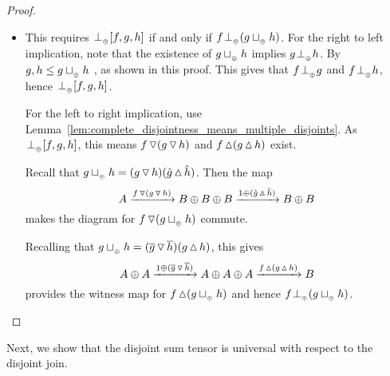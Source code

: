 \begin{proof}
\begin{itemize}
    \item [\axiom{DJ}{4}] This requires $\tperp [f,g,h]$ if and only if $f \tperp (g \tjoin h)$.
      For the right to left implication, note that the existence of $g\tjoin h$ implies $g \tperp
      h$. By  $g, h \le g\tjoin h$ , as shown in this proof. This gives
      that $f \tperp g$ and $f \tperp h$, hence $\tperp [f,g,h]$.

      For the left to right implication, use
      Lemma~\ref{lem:complete_disjointness_means_multiple_disjoints}. As $\tperp [f,g,h]$,
      this means $f\tjdown(g\tjdown h)$ and $f\tjup(g\tjup h)$ exist.

      Recall that $g\tjoin h = (g\tjdown h)(\rg{g}\tjup\rg{h})$. Then the map
      \[
        A\xrightarrow{f\tjdown(g\tjdown h)} B\+B\+B\xrightarrow{1\+(\rg{g}\tjup\rg{h})} B\+B
      \]
      makes the diagram for $f \tjdown (g\tjoin h)$ commute.

      Recalling that  $g\tjoin h =
      (\rst{g}\tjdown \rst{h})(g\tjup h)$, this gives
      \[
        A\+A\xrightarrow{1\+(\rst{g}\tjdown\rst{h})}A\+A\+A\xrightarrow{f\tjup(g\tjup h)}B
      \]
      provides the witness map for $f \tjup(g\tjoin h)$ and hence $f \tperp (g \tjoin h)$.
  \end{itemize}

\end{proof}

Next, we show that the disjoint sum tensor is universal with respect to the disjoint join.

